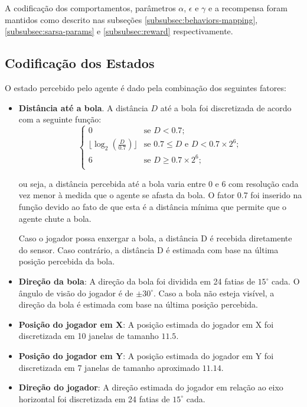 A codificação dos comportamentos, parâmetros $\alpha$, $\epsilon$ e $\gamma$ e a recompensa foram mantidos como descrito nas subseções \ref{subsubsec:behaviors-mapping}, \ref{subsubsec:sarsa-params} e \ref{subsubsec:reward} respectivamente.

\subsection{Codificação dos Estados}
\label{subsubsec:state-encoding}

O estado percebido pelo agente é dado pela combinação dos seguintes fatores:

\begin{itemize}
	\item \textbf{Distância até a bola}. A distância $D$ até a bola foi discretizada de acordo com a seguinte função:
	\begin{equation}
		\label{eq:balldist}
		\left\{
		\begin{array}{ll}
			0  & \mbox{se } D < 0.7; \\
			\lfloor\log_2 (\frac{D}{0.7})\rfloor & \mbox{se } 0.7 \leq D \mbox{ e } D < 0.7 \times 2^6; \\
			6  & \mbox{se } D \geq 0.7 \times 2^6; \\
		\end{array}
		\right.
	\end{equation}
	
	ou seja, a distância percebida até a bola varia entre 0 e 6 com resolução cada vez menor à medida que o agente se afasta da bola. O fator 0.7 foi inserido na função devido ao fato de que esta é a distância mínima que permite que o agente chute a bola.
	
	Caso o jogador possa enxergar a bola, a distância D é recebida diretamente do sensor. Caso contrário, a distância D é estimada com base na última posição percebida da bola.
	
	\item \textbf{Direção da bola}: A direção da bola foi dividida em 24 fatias de $15^{\circ}$ cada. O ângulo de visão do jogador é de $\pm30^{\circ}$. Caso a bola não esteja visível, a direção da bola é estimada com base na última posição percebida.
	
	\item \textbf{Posição do jogador em X}: A posição estimada do jogador em X foi discretizada em 10 janelas de tamanho $11.5$.
	
	\item \textbf{Posição do jogador em Y}: A posição estimada do jogador em Y foi discretizada em 7 janelas de tamanho aproximado $11.14$.
	
	\item \textbf{Direção do jogador}: A direção estimada do jogador em relação ao eixo horizontal foi discretizada em 24 fatias de $15^{\circ}$ cada.
	
\end{itemize}

